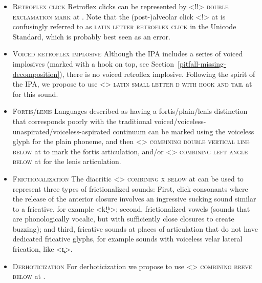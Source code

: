 \begin{itemize}
  
\item \textsc{Retroflex click} \newline
      Retroflex clicks can be represented by <‼> \textsc{double exclamation
      mark} at . Note that the (post-)alveolar click <ǃ> at 
      is confusingly referred to as \textsc{latin letter retroflex click} in the
      Unicode Standard, which is probably best seen as an error.
\item \textsc{Voiced retroflex implosive} \newline 
      Although the IPA includes a
      series of voiced implosives (marked with a hook on top, see
      Section~\ref{pitfall-missing-decomposition}), there is no voiced retroflex
      implosive. Following the spirit of the IPA, we propose to use <>
      \textsc{latin small letter d with hook and tail} at  for this
      sound.
\item \textsc{Fortis/lenis} \newline
      Languages described as having a fortis/plain/lenis distinction that
      corresponds poorly with the traditional
      voiced/voiceless-unaspirated/voiceless-aspirated continuum can be marked
      using the voiceless glyph for the plain phoneme, and then 
      <> \textsc{combining double vertical line below} at
       to mark the fortis articulation, and/or <>
      \textsc{combining left angle below} at  for the lenis
      articulation.
\item \textsc{Frictionalization} \newline 
      The diacritic <>
      \textsc{combining x below} at  can be used to represent three
      types of frictionalized sounds: First, click consonants where the release
      of the anterior closure involves an ingressive sucking sound similar
      to a fricative, for example <kǃ͓ʰ>; second, frictionalized vowels
      (sounds that are phonologically vocalic, but with sufficiently close
      closures to create buzzing); and third, fricative sounds at places of
      articulation that do not have dedicated fricative glyphs, for example
      sounds with voiceless velar lateral frication, like <ʟ̥͓>.
\item \textsc{Derhoticization} \newline 
      For derhoticization we propose to use
      <> \textsc{combining breve below} at . 

\end{itemize}
